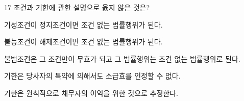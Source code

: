 \begin{question}{17}
조건과 기한에 관한 설명으로 옳지 않은 것은?
\begin{choices}
  \item 기성조건이 정지조건이면 조건 없는 법률행위가 된다.
  \item 불능조건이 해제조건이면 조건 없는 법률행위가 된다.
  \item 불법조건은 그 조건만이 무효가 되고 그 법률행위는 조건 없는 법률행위로 된다.
  \item 기한은 당사자의 특약에 의해서도 소급효를 인정할 수 없다.
  \item 기한은 원칙적으로 채무자의 이익을 위한 것으로 추정한다.
\end{choices}
\end{question}
